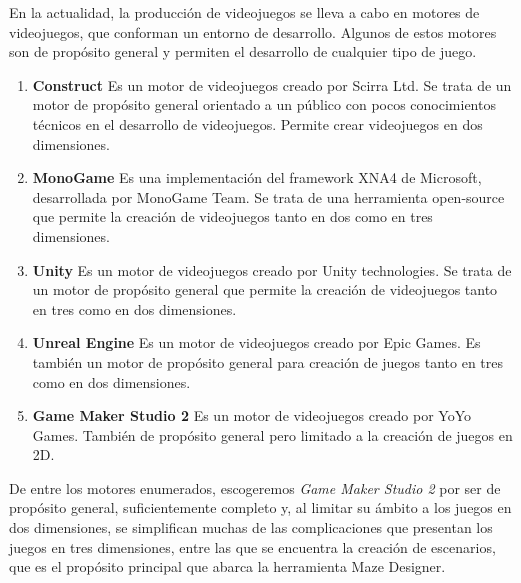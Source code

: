 En la actualidad, la producción de videojuegos se lleva a cabo en motores de videojuegos, que conforman un entorno de desarrollo. Algunos de estos motores son de propósito general y permiten el desarrollo de cualquier tipo de juego.
\begin{enumerate}
	\item \textbf{Construct} Es un motor de videojuegos creado por Scirra Ltd. Se trata de un motor de propósito general orientado a un público con pocos conocimientos técnicos en el desarrollo de videojuegos. Permite crear videojuegos en dos dimensiones.
	\item \textbf{MonoGame} Es una implementación del framework XNA4 de Microsoft, desarrollada por MonoGame Team. Se trata de una herramienta open-source que permite la creación de videojuegos tanto en dos como en tres dimensiones.
	\item \textbf{Unity} Es un motor de videojuegos creado por Unity technologies. Se trata de un motor de propósito general que permite la creación de videojuegos tanto en tres como en dos dimensiones.
	\item \textbf{Unreal Engine} Es un motor de videojuegos creado por Epic Games. Es también un motor de propósito general para creación de juegos tanto en tres como en dos dimensiones.
	\item \textbf{Game Maker Studio 2} Es un motor de videojuegos creado por YoYo Games. También de propósito general pero limitado a la creación de juegos en 2D.
\end{enumerate}

De entre los motores enumerados, escogeremos \textit{Game Maker Studio 2} por ser de propósito general, suficientemente completo y, al limitar su ámbito a los juegos en dos dimensiones, se simplifican muchas de las complicaciones que presentan los juegos en tres dimensiones, entre las que se encuentra la creación de escenarios, que es el propósito principal que abarca la herramienta Maze Designer.